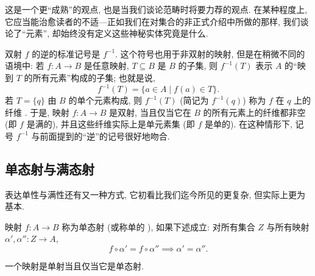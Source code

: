 这是一个更``成熟''的观点, 也是当我们谈论范畴时将要力荐的观点. 在某种程度上, 它应当能治愈读者的不适---正如我们在对集合的非正式介绍中所做的那样, 我们谈论了``元素'', 却始终没有定义这些神秘实体究竟是什么.

双射 $f$ 的逆的标准记号是 $f^{-1}$. 这个符号也用于非双射的映射, 但是在稍微不同的语境中: 若 $f : A \to B$ 是任意映射, $T \subseteq B$ 是 $B$ 的子集, 则 $f^{-1}(T)$ 表示 $A$ 的``映到 $T$ 的所有元素''构成的子集; 也就是说,
\[
f^{-1}(T) = \{a \in A \mid f(a) \in T\}.
\]
若 $T = \{q\}$ 由 $B$ 的单个元素构成, 则 $f^{-1}(T)$ (简记为 $f^{-1}(q)$) 称为 $f$ 在 $q$ 上的纤维%
. 于是, 映射 $f : A \to B$ 是双射, 当且仅当它在 $B$ 的所有元素上的纤维都非空 (即 $f$ 是满的), 并且这些纤维实际上是单元素集 (即 $f$ 是单的). 在这种情形下, 记号 $f^{-1}$ 与前面提到的``逆''的记号很好地吻合.

\subsection{单态射与满态射}
\label{subsec:mono-epi}

表达单性与满性还有又一种方式, 它初看比我们迄今所见的更复杂, 但实际上更为基本.

映射 $f : A \to B$ 称为单态射%
(或称单的%
), 如果下述成立: 对所有集合 $Z$ 与所有映射 $\alpha', \alpha'' : Z \to A$,
\[
f \circ \alpha' = f \circ \alpha'' \implies \alpha' = \alpha''.
\]

\begin{proposition}
\label{prop:mono-injective}
一个映射是单射当且仅当它是单态射.
\end{proposition}

